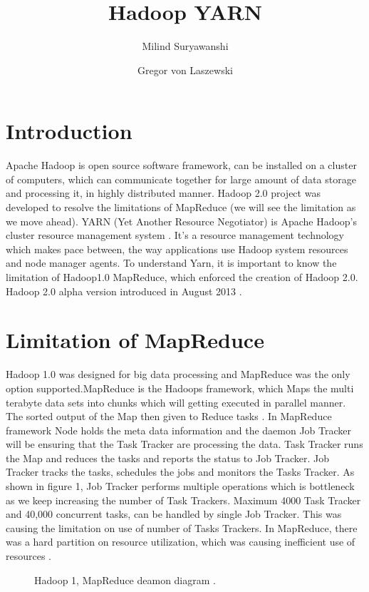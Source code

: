 \documentclass[9pt,twocolumn,twoside]{../../styles/osajnl}
\title{Hadoop YARN}
\author[1,2]{Milind Suryawanshi}
\author[1,*]{Gregor von Laszewski}
\affil[1]{School of Informatics and Computing, Bloomington, IN 47408, U.S.A.}
\affil[2]{Savitribai Phule Pune University 2010, Pune, Maharashtra 411007 India }
\affil[*]{Corresponding authors: laszewski@gmail.com}
\begin{document}
\maketitle

\section{Introduction}

Apache Hadoop \cite{www-7} is open source software framework, can be installed on a cluster of computers, which can communicate together for large amount of data storage and processing it, in highly distributed manner. Hadoop 2.0 project was developed to resolve the limitations of MapReduce (we will see the limitation as we move ahead). YARN (Yet Another Resource Negotiator) is Apache Hadoop’s cluster resource management system \cite{www-1}. It’s a resource management technology which makes pace between, the way applications use Hadoop system resources and node manager agents. To understand Yarn, it is important to know the limitation of Hadoop1.0 MapReduce, which enforced the creation of Hadoop 2.0. Hadoop 2.0 alpha version introduced in August 2013 \cite{www-8}.


\section{Limitation of MapReduce}

Hadoop 1.0 was designed for big data processing and MapReduce was the only option supported.MapReduce is the Hadoops framework, which Maps the multi terabyte data sets into chunks which will getting executed in parallel manner. The sorted output of the Map then given to Reduce tasks \cite{www-6}. In MapReduce framework Node holds the meta data information and the daemon Job Tracker will be ensuring that the Task Tracker are processing the data. Task Tracker runs the Map and reduces the tasks and reports the status to Job Tracker. Job Tracker tracks the tasks, schedules the jobs and monitors the Tasks Tracker. As shown in figure 1, Job Tracker performs multiple operations which is bottleneck as we keep increasing the number of Task Trackers. Maximum 4000 Task Tracker and 40,000 concurrent tasks, can be handled by single Job Tracker. This was causing the limitation on use of number of Tasks Trackers. In MapReduce, there was a hard partition on resource utilization, which was causing inefficient use of resources \cite{www-3}.

\begin{figure}[htbp]
	\centering
	\caption{Hadoop 1, MapReduce deamon diagram \cite{www-3}. }
	\label{fig:false-color}
\end{figure}
\end{document}
